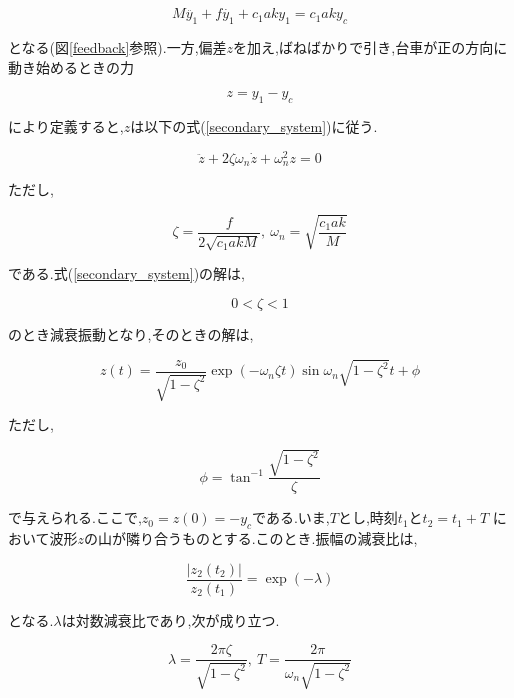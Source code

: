\documentclass[a4j,11pt,twoside]{jbook}
\begin{document}
\begin{enumerate}
\begin{itemize}
        \begin{equation}
            M \ddot{y_{1}} + f \dot{y_{1}} + c_{1}aky_{1} = c_{1}aky_{c}
        \end{equation}

        となる(図\ref{feedback}参照).一方,偏差$z$を加え,ばねばかりで引き,台車が正の方向に動き始めるときの力

        \begin{equation}
            z = y_{1} - y_{c}
        \end{equation}

        により定義すると,$z$は以下の式(\ref{secondary_system})に従う.

        \begin{equation}
            \ddot{z} + 2\zeta \omega_{n} \dot{z} + \omega_{n}^2 z = 0
            \label{secondary_system}
        \end{equation}

        ただし,

        \begin{equation}
            \zeta = \frac{f}{2\sqrt{c_{1}akM}},\ \omega_{n} = \sqrt{\frac{c_{1}ak}{M}}
            \label{zeta}
        \end{equation}

        である.式(\ref{secondary_system})の解は,

        $$
            0 < \zeta < 1
        $$

        のとき減衰振動となり,そのときの解は,

        $$
            z(t) = \frac{z_{0}}{\sqrt{1 - \zeta^2}} \exp(-\omega_{n} \zeta t)
            \sin{\omega_{n}} \sqrt{1 - \zeta^2}t + \phi
        $$

        ただし,
        
        $$
            \phi = \tan^{-1}{\frac{\sqrt{1 - \zeta^2}}{\zeta}}
        $$

        で与えられる.ここで,$z_{0} = z(0) = -y_{c}$である.いま,$T$とし,時刻$t_{1}$と$t_{2} = t_{1} + T$
        において波形$z$の山が隣り合うものとする.このとき.振幅の減衰比は,

        \begin{equation}
            \frac{|z_{2}(t_{2})|}{z_{2}(t_{1})} = \exp(-\lambda)
        \end{equation}

        となる.$\lambda$は対数減衰比であり,次が成り立つ.

        \begin{equation}
            \lambda = \frac{2\pi \zeta}{\sqrt{1 - \zeta^2}},\
            T = \frac{2\pi}{\omega_{n} \sqrt{1 - \zeta^2}}
            \label{lambda}
        \end{equation}


\end{itemize}
\end{enumerate}
\end{document}
